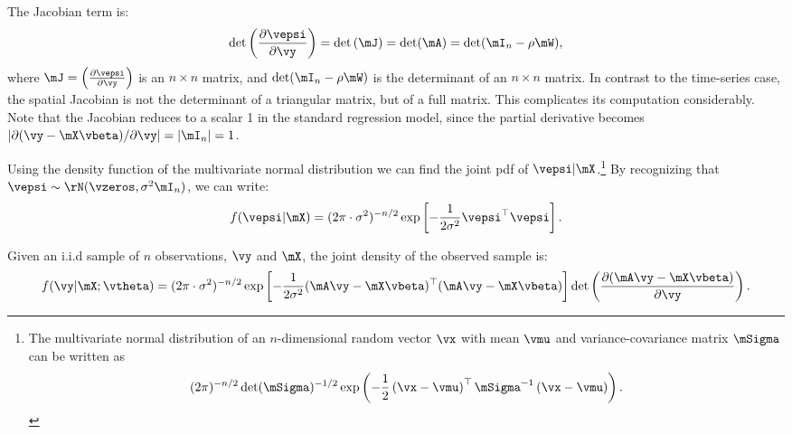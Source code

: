 \documentclass[english,12pt]{book}\usepackage[]{graphicx}\usepackage[]{xcolor}
\begin{document}
The Jacobian term is:
\begin{equation*}
\det\left(\frac{\partial \vepsi}{\partial \vy}\right)= \det\left(\mJ\right)=\det(\mA)=\det(\mI_n - \rho\mW),
\end{equation*}
%
where $\mJ = \left(\frac{\partial \vepsi}{\partial \vy}\right)$ is an $n\times n$ matrix, and $\det(\mI_n - \rho\mW)$ is the determinant of an $n \times n$ matrix. In contrast to the time-series case, the spatial Jacobian is not the determinant of a triangular matrix, but of a full matrix. This complicates its computation considerably. Note that the Jacobian reduces to a scalar 1 in the standard regression model, since the partial derivative becomes $\left|\partial (\vy - \mX\vbeta)/ \partial \vy\right| = \left|\mI_n\right| = 1$. 

Using the density function of the multivariate normal distribution we can find the joint pdf of $\vepsi|\mX$.\footnote{The multivariate normal distribution of an $n$-dimensional random vector $\vx$ with mean $\vmu$ and variance-covariance matrix $\mSigma$ can be written as 
\begin{equation*}
(2\pi)^{-n/2}\det(\mSigma)^{-1/2}\exp\left(-\frac{1}{2}\left(\vx - \vmu\right)^\top\mSigma^{-1}\left(\vx - \vmu\right)\right).
\end{equation*}
} By recognizing that $\vepsi \sim \rN(\vzeros, \sigma^2\mI_n)$, we can write: 
\begin{equation*}
	f(\vepsi | \mX) = (2\pi \cdot\sigma^2)^{-n/2}\exp\left[-\frac{1}{2\sigma^2}\vepsi^\top\vepsi\right].
\end{equation*}

Given an i.i.d sample of $n$ observations, $\vy$ and $\mX$, the joint density of the observed sample is:
\begin{equation*}
	f(\vy|\mX;\vtheta) = (2\pi \cdot\sigma^2)^{-n/2}\exp\left[-\frac{1}{2\sigma^2}(\mA\vy-\mX\vbeta)^\top (\mA\vy-\mX\vbeta)\right]\det\left(\frac{\partial (\mA\vy - \mX\vbeta)}{\partial \vy}\right).
	\end{equation*}
	
\end{document}
